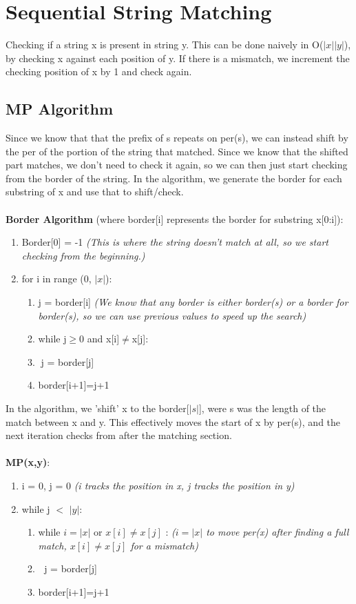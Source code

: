 \section{Sequential String Matching}
Checking if a string x is present in string y. This can be done naively in O($|x||y|$), by checking x against each position of y. If there is a mismatch, we increment the checking position of x by 1 and check again.


\subsection{MP Algorithm}
Since we know that that the prefix of s repeats on per(s), we can instead shift by the per of the portion of the string that matched. Since we know that the shifted part matches, we don't need to check it again, so we can then just start checking from the border of the string. In the algorithm, we generate the border for each substring of x and use that to shift/check.\\ \\
\textbf{Border Algorithm} (where border[i] represents the border for substring x[0:i]):
\begin{enumerate}[label=\Alph*]
    \item Border[0] = -1 \emph{(This is where the string doesn't match at all, so we start checking from the beginning.)}
    \item for i in range (0, $|x|$):
\begin{enumerate}[label=\arabic*]
    \item j = border[i] \emph{(We know that any border is either border(s) or a border for border(s), so we can use previous values to speed up the search)}
    \item while j$\geq0$ and x[i]$\neq$x[j]: 
    \item[ ] $\;$j = border[j]    
    \item border[i+1]=j+1 
\end{enumerate}    
\end{enumerate}
In the algorithm, we 'shift' x to the border[$|s|$], were s was the length of the match between x and y. This effectively moves the start of x by per(s), and the next iteration checks from after the matching section. \\ \\
\textbf{MP(x,y)}:
\begin{enumerate}[label=\Alph*]
    \item i = 0, j = 0 \emph{(i tracks the position in x, j tracks the position in y)}
    \item while j $<$ $|y|$:
\begin{enumerate}[label=\arabic*]
    \item while $i=|x|$ or $x[i]\neq x[j]$ : \emph{($i=|x|$ to move per(x) after finding a full match, $x[i]\neq x[j]$ for a mismatch)}
    \item[ ] $\;$ j = border[j]    
    \item border[i+1]=j+1 
\end{enumerate}    
\end{enumerate}

